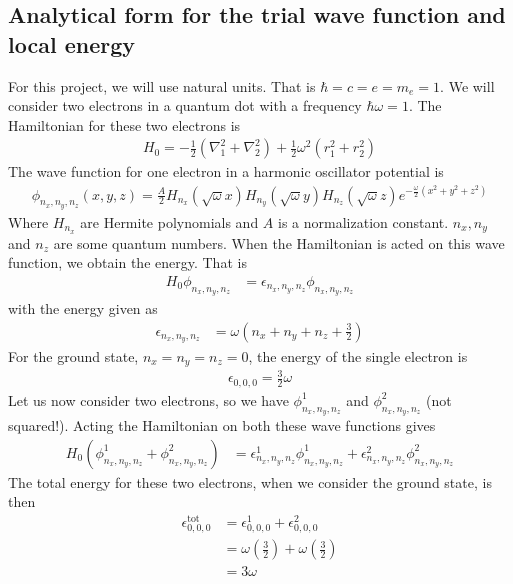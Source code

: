\documentclass[12pt]{article}
\begin{document}
\subsection{Analytical form for the trial wave function and local energy}
For this project, we will use natural units. That is $\hbar = c = e = m_e = 1$.
We will consider two electrons in a quantum dot with a frequency $\hbar \omega = 1$. The Hamiltonian for these two electrons is
\begin{align*}
H_0 = -\frac{1}{2}(\nabla_1^2 + \nabla_2^2) + \frac{1}{2}\omega^2(r_1^2 + r_2^2)
\end{align*}
The wave function for one electron in a harmonic oscillator potential is
\begin{align*}
\phi_{n_x, n_y, n_z}(x,y,z) = \frac{A}{2}H_{n_x}(\sqrt{\omega} x)H_{n_y}(\sqrt{\omega}y)H_{n_z}(\sqrt{\omega}z)e^{-\frac{\omega}{2}(x^2+y^2+z^2)}
\end{align*}
Where $H_{n_x}$ are Hermite polynomials and $A$ is a normalization constant. $n_x, n_y$ and $n_z$ are some quantum numbers. When the Hamiltonian is acted on this wave function, we obtain the energy. That is
\begin{align*}
H_0\phi_{n_x, n_y, n_z} &= \epsilon_{n_x, n_y, n_z}\phi_{n_x, n_y, n_z}
\end{align*}
with the energy given as
\begin{align*}
\epsilon_{n_x, n_y, n_z} &= \omega\left(n_x + n_y + n_z + \frac{3}{2} \right)
\end{align*}
For the ground state, $n_x = n_y = n_z = 0$, the energy of the single electron is
\begin{align*}
\epsilon_{0,0,0} = \frac{3}{2}\omega
\end{align*}
Let us now consider two electrons, so we have $\phi_{n_x, n_y, n_z}^1$ and $\phi_{n_x, n_y, n_z}^2$ (not squared!). Acting the Hamiltonian on both these wave functions gives
\begin{align*}
H_0(\phi_{n_x, n_y, n_z}^1 + \phi_{n_x, n_y, n_z}^2) &= \epsilon_{n_x, n_y, n_z}^1\phi_{n_x, n_y, n_z}^1 + \epsilon_{n_x, n_y, n_z}^2\phi_{n_x, n_y, n_z}^2 
\end{align*}
The total energy for these two electrons, when we consider the ground state, is then
\begin{align*}
\epsilon_{0,0,0}^{\text{tot}} &= \epsilon_{0,0,0}^1 + \epsilon_{0,0,0}^2 \\
&= \omega\left(\frac{3}{2} \right) + \omega\left(\frac{3}{2} \right)\\
&= 3\omega
\end{align*}
\end{document}
